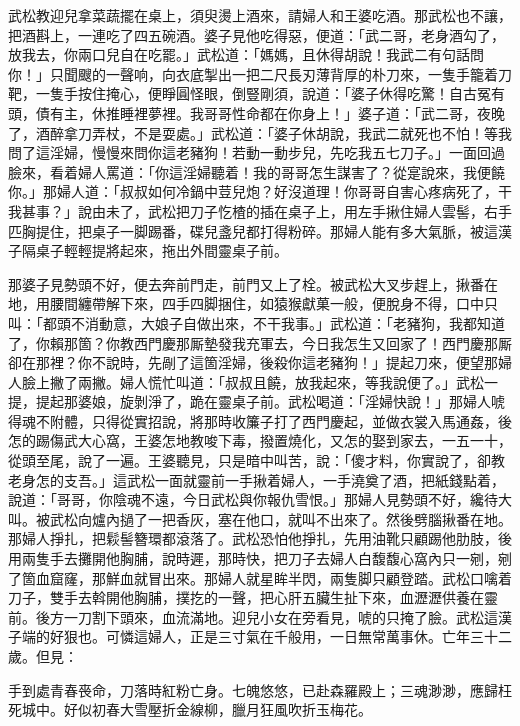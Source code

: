 武松教迎兒拿菜蔬擺在桌上，須臾燙上酒來，請婦人和王婆吃酒。那武松也不讓，把酒斟上，一連吃了四五碗酒。婆子見他吃得惡，便道：「武二哥，老身酒勾了，放我去，你兩口兒自在吃罷。」武松道：「媽媽，且休得胡說！我武二有句話問你！」只聞颼的一聲响，向衣底掣出一把二尺長刃薄背厚的朴刀來，一隻手籠着刀靶，一隻手按住掩心，便睜圓怪眼，倒豎剛須，說道：「婆子休得吃驚！自古冤有頭，債有主，休推睡裡夢裡。我哥哥性命都在你身上！」婆子道：「武二哥，夜晚了，酒醉拿刀弄杖，不是耍處。」武松道：「婆子休胡說，我武二就死也不怕！等我問了這淫婦，慢慢來問你這老豬狗！若動一動步兒，先吃我五七刀子。」一面回過臉來，看着婦人罵道：「你這淫婦聽着！我的哥哥怎生謀害了？從寔說來，我便饒你。」那婦人道：「叔叔如何冷鍋中荳兒炮？好沒道理！你哥哥自害心疼病死了，干我甚事？」說由未了，武松把刀子忔楂的插在桌子上，用左手揪住婦人雲髻，右手匹胸提住，把桌子一脚踢番，碟兒盞兒都打得粉碎。那婦人能有多大氣脈，被這漢子隔桌子輕輕提將起來，拖出外間靈桌子前。

那婆子見勢頭不好，便去奔前門走，前門又上了栓。被武松大叉步趕上，揪番在地，用腰間纏帶解下來，四手四脚捆住，如猿猴獻菓一般，便脫身不得，口中只叫：「都頭不消動意，大娘子自做出來，不干我事。」武松道：「老豬狗，我都知道了，你賴那箇？你教西門慶那厮墊發我充軍去，今日我怎生又回家了！西門慶那厮卻在那裡？你不說時，先剮了這箇淫婦，後殺你這老豬狗！」提起刀來，便望那婦人臉上撇了兩撇。婦人慌忙叫道：「叔叔且饒，放我起來，等我說便了。」武松一提，提起那婆娘，旋剝淨了，跪在靈桌子前。武松喝道：「淫婦快說！」那婦人唬得魂不附體，只得從實招說，將那時收簾子打了西門慶起，並做衣裳入馬通姦，後怎的踢傷武大心窩，王婆怎地教唆下毒，撥置燒化，又怎的娶到家去，一五一十，從頭至尾，說了一遍。{}王婆聽見，只是暗中叫苦，說：「傻才料，你實說了，卻教老身怎的支吾。」{}這武松一面就靈前一手揪着婦人，一手澆奠了酒，把紙錢點着，說道：「哥哥，你陰魂不遠，今日武松與你報仇雪恨。」那婦人見勢頭不好，纔待大叫。被武松向爐內撾了一把香灰，塞在他口，就叫不出來了。然後劈腦揪番在地。那婦人掙扎，把鬏髻簪環都滾落了。{}武松恐怕他掙扎，先用油靴只顧踢他肋肢，後用兩隻手去攤開他胸脯，說時遲，那時快，把刀子去婦人白馥馥心窩內只一剜，剜了箇血窟窿，那鮮血就冒出來。那婦人就星眸半閃，兩隻脚只顧登踏。武松口噙着刀子，雙手去斡開他胸脯，撲扢的一聲，把心肝五臟生扯下來，血瀝瀝供養在靈前。後方一刀割下頭來，血流滿地。{}迎兒小女在旁看見，唬的只掩了臉。武松這漢子端的好狠也。可憐這婦人，正是三寸氣在千般用，一日無常萬事休。亡年三十二歲。但見：

\begin{myquote}
手到處青春䘮命，刀落時紅粉亡身。七魄悠悠，已赴森羅殿上；三魂渺渺，應歸枉死城中。好似初春大雪壓折金線柳，臘月狂風吹折玉梅花。
\end{myquote}


